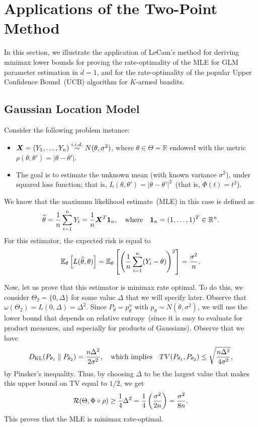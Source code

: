 \documentclass[12pt]{article}
\begin{document}
\section{Applications of the Two-Point Method}
\label{sec:applications-of-two-point-method}
In this section, we illustrate the application of LeCam's method for deriving minimax lower bounds for proving the rate-optimality of the MLE for GLM parameter estimation in $d=1$, and for the rate-optimality of the popular Upper Confidence Bound~(UCB) algorithm for $K$-armed bandits. 
\subsection{Gaussian Location Model}
\label{subsec:gaussian-location-model}

Consider the following problem instance: 
\begin{itemize}
	\item ${\boldsymbol X} = (Y_1, \ldots, Y_n) \stackrel{i.i.d.}{\sim} N(\theta, \sigma^2)$, where $\theta \in \Theta = \mathbb{R}$ endowed with the metric $\rho(\theta, \theta') = |\theta - \theta'|$. 
	\item The goal is to estimate the unknown mean (with known variance $\sigma^2$), under squared loss function; that is, $L(\theta, \theta') = |\theta - \theta'|^2$~(that is, $\Phi(t) = t^2$). 
\end{itemize}
We know that the maximum likelihood estimate~(MLE) in this case is defined as 
\begin{align}
\widehat{\theta} = \frac{1}{n} \sum_{i=1}^n Y_i = \frac 1 n {\boldsymbol X}^T \boldsymbol{1}_n, \quad \text{where} \quad \boldsymbol{1}_n = (1, \ldots, 1)^T \in \mathbb{R}^n. 
\end{align}
For this estimator, the expected risk is equal to 
\begin{align}
\mathbb{E}_\theta\left[ L(\widehat{\theta}, \theta) \right] = \mathbb{E}_\theta \left[ \left( \frac{1}{n} \sum_{i=1}^n (Y_i - \theta) \right)^2 \right] = \frac{\sigma^2}{n}. 
\end{align}

Now, let us prove that this estimator is minimax rate optimal. To do this, we consider $\Theta_2 = \{0, \Delta\}$ for some value $\Delta$ that we will specify later. Observe that $\omega(\Theta_2) = L(0, \Delta) = \Delta^2$. Since $P_{\theta} = p_{\theta}^{n}$ with $p_\theta \sim N(\theta, \sigma^2)$, we will use the lower bound that depends on relative entropy~(since it is easy to evaluate for product measures, and especially for products of Gaussians). Observe that we have 
\begin{align}
D_{\text{KL}}(P_{\theta_1} \parallel P_{\theta_2}) = \frac{n \Delta^2}{2 \sigma^2}, \quad \text{which implies} \quad TV(P_{\theta_1}, P_{\theta_2}) \leq \sqrt{\frac{n \Delta^2}{4 \sigma^2}}, 
\end{align}
by Pinsker's inequality. Thus, by choosing $\Delta$ to be the largest value that makes this upper bound on TV equal to $1/2$, we get 
\begin{align}
{\cal R}(\Theta, \Phi\circ \rho) \geq \frac{1}{4} \Delta^2 = \frac{1}{4} \left( \frac{\sigma^2}{2n} \right) = \frac{\sigma^2}{8n}. 
\end{align}
This proves that the MLE is minimax rate-optimal. 
\end{document}
